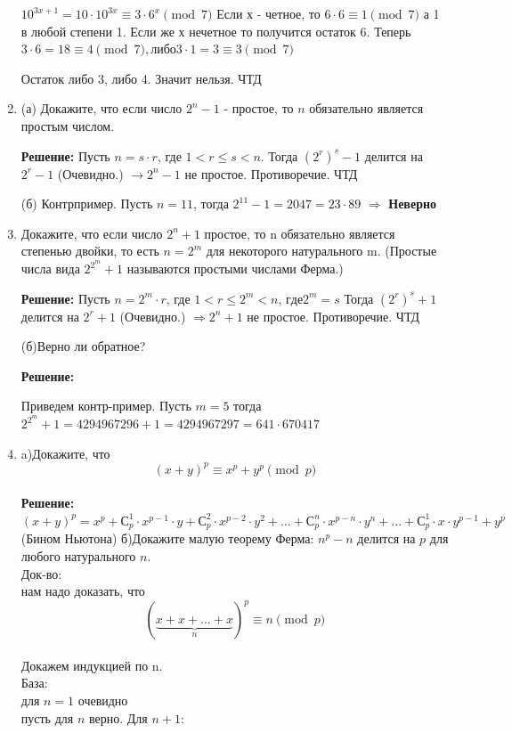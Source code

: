 \documentclass[]{book}
\theoremstyle{definition}
\newcommand{\bb}[1]{\mathbb{#1}}
\renewcommand{\leq}{\leqslant}
\begin{document}
\begin{enumerate}[resume]
$10^{3x+1}=10\cdot10^{3x} \equiv 3\cdot{6^x} \pmod{7}$ Если $х$ - четное, то $6\cdot6\equiv 1 \pmod{7}$ а 1 в любой степени 1. Если же $х$ нечетное то получится остаток 6. Теперь $3\cdot6=18\equiv 4 \pmod{7}, либо 3\cdot1=3\equiv 3 \pmod{7}$

Остаток либо 3, либо 4. Значит нельзя. ЧТД



\item (а) Докажите, что если число $2^{n} -1$ - простое, то $n$ обязательно является простым числом.

\textbf{Решение:}
Пусть $n={s}\cdot{r}$, где $1<{r} \leq{s}<n$. Тогда $\left(2^{r}\right)^{s} -1$ делится на $2^{r} -1 $ (Очевидно.) $\rightarrow 2^{n} - 1$ не простое. Противоречие. ЧТД

(б) Контрпример. Пусть $n=11$, тогда $2^{11} -1 = 2047 =23\cdot{89} $ $\Rightarrow$ \textbf{Неверно}



\item Докажите, что если число $2^{n} +1$ простое, то n обязательно является степенью двойки, то есть $n=2^m$ для некоторого натурального m. (Простые числа вида $2^{2^{m}} +1$ называются простыми числами Ферма.)

\textbf{Решение:}
Пусть $n={2^m}\cdot{r}$, где $1<{r} \leq{2^m}<n$, $где 2^m=s$ Тогда $\left(2^{r}\right)^{s} +1$ делится на $2^{r} +1 $ (Очевидно.) $\Rightarrow 2^{n} + 1$ не простое. Противоречие. ЧТД

(б)Верно ли обратное?

\textbf{Решение:}

Приведем контр-пример. Пусть $m=5$ тогда $2^{2^{m}} +1 = 4294967296 + 1 = 4294967297 = 641\cdot 670417$

\item a)Докажите, что \\
$$(x+y)^{p} \equiv x^{p}+y^{p} \pmod{p}$$\\
\textbf{Решение:}
$(x+y)^{p} = x^{p} + \bb{С}^1_p\cdot{x^{p-1}}\cdot{y}+ \bb{С}^2_p\cdot{x^{p-2}}\cdot{y}^{2}+...+\bb{С}^n_p\cdot{x^{p-n}}\cdot{y}^{n}+...+ \bb{С}^1_p\cdot{x}\cdot{y}^{p-1}+y^{p}$ (Бином Ньютона)
б)Докажите малую теорему Ферма: $n^{p}-n$ делится на $p$ для любого натурального $n$.\\
Док-во:\\
нам надо доказать, что $${(\underbrace{x + x + \ldots + x}_{n})}^{p} \equiv n \pmod{p}$$\\
Докажем индукцией по n.\\
База:\\
для $n=1$ очевидно\\
пусть для $n$ верно. Для $n+1$:


\end{enumerate}
\end{document}
